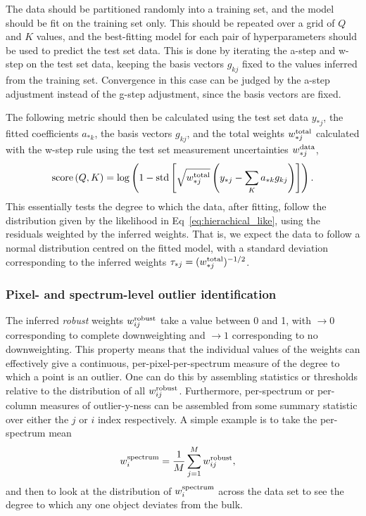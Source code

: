 \documentclass[onecolumn,floatfix]{aastex631}
\DeclareMathOperator*{\score}{score}
\begin{document}
The data should be partitioned randomly into a training set, and the model should be fit on the training set only.
This should be repeated over a grid of $Q$ and $K$ values, and the best-fitting model for each pair of hyperparameters should be used to predict the test set data.
This is done by iterating the a-step and w-step on the test set data, keeping the basis vectors $g_{kj}$ fixed to the values inferred from the training set.
Convergence in this case can be judged by the a-step adjustment instead of the g-step adjustment, since the basis vectors are fixed.

The following metric should then be calculated using the test set data $y_{*j}$, the fitted coefficients $a_{*k}$, the basis vectors $g_{kj}$, and the total weights $w^{\rm total}_{*j}$ calculated with the w-step rule using the test set measurement uncertainties $w^{\rm data}_{*j}$,
\begin{align}
    \score{\left( Q, K \right)} = {\rm log} \left( 1 - {\rm std} \left[ \sqrt{w^{\rm total}_{*j}}\left(y_{*j} - \sum_K a_{*k} g_{kj}\right) \right] \right). \label{eq:score}
\end{align}
This essentially tests the degree to which the data, after fitting, follow the distribution given by the likelihood in Eq~\eqref{eq:hierachical_like}, using the residuals weighted by the inferred weights.
That is, we expect the data to follow a normal distribution centred on the fitted model, with a standard deviation corresponding to the inferred weights $\tau_{*j}=(w_{*j}^{\rm total})^{-1/2}$.

\subsubsection{Pixel- and spectrum-level outlier identification} \label{sec:outlier_id}

The inferred  \emph{robust} weights $w^{\rm robust}_{ij}$ take a value between 0 and 1, with $\rightarrow0$ corresponding to complete downweighting and $\rightarrow1$ corresponding to no downweighting.
This property means that the individual values of the weights can effectively give a continuous, per-pixel-per-spectrum measure of the degree to which a point is an outlier.
One can do this by assembling statistics or thresholds relative to the distribution of all $w^{\rm robust}_{ij}$.
Furthermore, per-spectrum or per-column measures of outlier-y-ness can be assembled from some summary statistic over either the $j$ or $i$ index respectively.
A simple example is to take the per-spectrum mean
\begin{align}
    w^{\rm spectrum}_i &= \frac{1}{M}\sum_{j=1}^M w_{ij}^{\rm robust}, \label{eq:w_spec}
\end{align}
and then to look at the distribution of $w^{\rm spectrum}_i$ across the data set to see the degree to which any one object deviates from the bulk.
\end{document}
